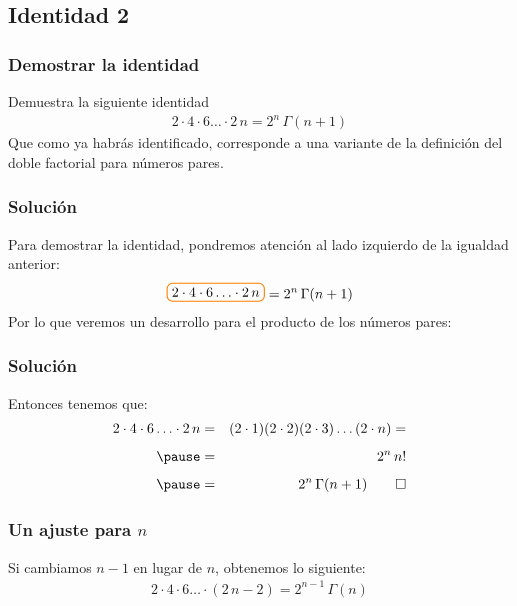 \documentclass[12pt]{beamer}
\begin{document}
\subsection{Identidad 2}
\begin{frame}
\frametitle{Demostrar la identidad}
Demuestra la siguiente identidad
\begin{align*}
2 \cdot 4 \cdot 6 \ldots \cdot 2 \, n = 2^{n} \, \Gamma (n + 1)
\end{align*}
\pause
Que como ya habrás identificado, corresponde a una variante de la definición del doble factorial para números pares.
\end{frame}
\begin{frame}[t]
\frametitle{Solución}
Para demostrar la identidad, pondremos atención al lado izquierdo de la igualdad anterior:
\pause
\begin{align*}
\boxedcolor{2 \cdot 4 \cdot 6 \ldots \cdot 2 \, n } = 2^{n} \, \Gamma (n + 1)
\end{align*}
\pause
Por lo que veremos un desarrollo para el producto de los números pares:
\end{frame}
\begin{frame}
\frametitle{Solución}
Entonces tenemos que:
\begin{eqnarray}
2 \cdot 4 \cdot 6 \ldots \cdot 2 \, n  &=& (2 \cdot 1) (2 \cdot 2) (2 \cdot 3) \ldots (2 \cdot n) = \nonumber \\[0.5em] \pause
&=& 2^{n} \, n! \nonumber \\[0.5em] \pause
&=& 2^{n} \, \Gamma (n + 1) \qed \label{eq:ecuacion_01_16}
\end{eqnarray}
\end{frame}
\begin{frame}
\frametitle{Un ajuste para $n$}
Si cambiamos $n - 1$ en lugar de $n$, obtenemos lo siguiente:
\begin{align*}
2 \cdot 4 \cdot 6 \ldots \cdot (2 \, n - 2)  = 2^{n-1} \, \Gamma (n)
\end{align*}
\end{frame}
\end{document}
